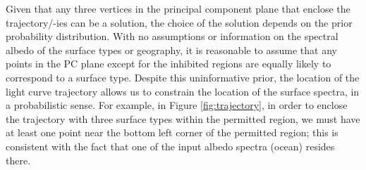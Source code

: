 \documentclass[iop,numberedappendix,apj]{emulateapj}
\begin{document}
Given that any three vertices in the principal component plane that enclose the trajectory/-ies can be a solution, the choice of the solution depends on the prior probability distribution. 
With no assumptions or information on the spectral albedo of the surface types or geography, it is reasonable to assume that any points in the PC plane except for the inhibited regions are equally likely to correspond to a surface type. 
Despite this uninformative prior, the location of the light curve trajectory allows us to constrain the location of the surface spectra, in a probabilistic sense. 
For example, in Figure \ref{fig:trajectory}, in order to enclose the trajectory with three surface types within the permitted region, we must have at least one point near the bottom left corner of the permitted region; this is consistent with the fact that one of the input albedo spectra (ocean) resides there. 
\end{document}
